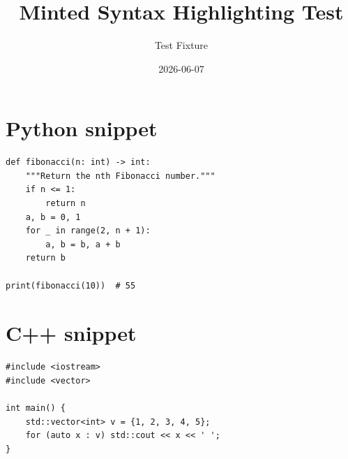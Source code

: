 \documentclass{article}
\title{Minted Syntax Highlighting Test}
\author{Test Fixture}
\date{2026-06-07}
\begin{document}
\maketitle

\section{Python snippet}

\begin{verbatim}
def fibonacci(n: int) -> int:
    """Return the nth Fibonacci number."""
    if n <= 1:
        return n
    a, b = 0, 1
    for _ in range(2, n + 1):
        a, b = b, a + b
    return b

print(fibonacci(10))  # 55
\end{verbatim}

\section{C++ snippet}

\begin{verbatim}
#include <iostream>
#include <vector>

int main() {
    std::vector<int> v = {1, 2, 3, 4, 5};
    for (auto x : v) std::cout << x << ' ';
}
\end{verbatim}
\end{document}
